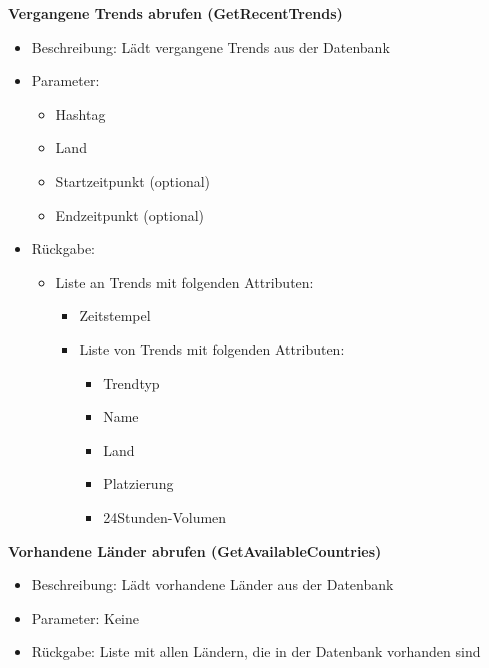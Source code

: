 \documentclass[conference]{IEEEtran}
\begin{document}
\smallskip
\textbf{Vergangene Trends abrufen (GetRecentTrends)}
\begin{itemize}
    \item Beschreibung: Lädt vergangene Trends aus der Datenbank
    \item Parameter:
          \begin{itemize}
              \item Hashtag
              \item Land
              \item Startzeitpunkt (optional)
              \item Endzeitpunkt (optional)
          \end{itemize}
    \item Rückgabe:
          \begin{itemize}
              \item Liste an Trends mit folgenden Attributen:
                    \begin{itemize}
                        \item Zeitstempel
                        \item Liste von Trends mit folgenden Attributen:
                              \begin{itemize}
                                \item Trendtyp
                                \item Name
                                \item Land
                                \item Platzierung
                                \item 24Stunden-Volumen
                              \end{itemize}
                    \end{itemize}
          \end{itemize}
\end{itemize}

\smallskip
\textbf{Vorhandene Länder abrufen (GetAvailableCountries)}
\begin{itemize}
    \item Beschreibung: Lädt vorhandene Länder aus der Datenbank
    \item Parameter: Keine
    \item Rückgabe: Liste mit allen Ländern, die in der Datenbank vorhanden sind
\end{itemize}

\smallskip
\end{document}
